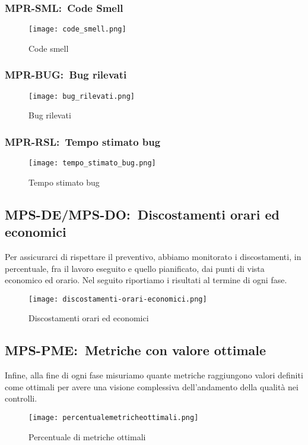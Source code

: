 \documentclass[../piano-di-qualifica.tex]{subfiles}
\begin{document}
\subsubsection{MPR-SML:~Code Smell}%
\label{subs:code_smell}


\begin{figure}[H]
  \centering
  \texttt{[image: code\_smell.png]}%
  \caption{Code smell}%
  \label{fig:code_smell}%
\end{figure}


\subsubsection{MPR-BUG:~Bug rilevati}%
\label{subs:bug_rilevati}

\begin{figure}[H]
  \centering
  \texttt{[image: bug\_rilevati.png]}%
  \caption{Bug rilevati}%
  \label{fig:bug_rilevati}%
\end{figure}

\subsubsection{MPR-RSL:~Tempo stimato bug}%
\label{subs:tempo_stimato}

\begin{figure}[H]
  \centering
  \texttt{[image: tempo\_stimato\_bug.png]}%
  \caption{Tempo stimato bug}%
  \label{fig:tempo_stimato_bug}%
\end{figure}


\newpage

\subsection{MPS-DE/MPS-DO:~Discostamenti orari ed economici}%
\label{sub:discostamenti_orari_ed_economici}
Per assicurarci di rispettare il preventivo, abbiamo monitorato i discostamenti, in percentuale, fra il lavoro eseguito e quello pianificato, dai punti di vista economico ed orario. Nel seguito riportiamo i risultati al termine di ogni fase.

\begin{figure}[H]
  \centering
  \texttt{[image: discostamenti-orari-economici.png]}%
  \caption{Discostamenti orari ed economici}%
  \label{fig:discostamenti_orari_economici}%
\end{figure}

\subsection{MPS-PME:~Metriche con valore ottimale}%
\label{sub:metriche_ottimali}
Infine, alla fine di ogni fase misuriamo quante metriche raggiungono valori definiti come ottimali per avere una visione complessiva dell'andamento della qualità nei controlli.
\begin{figure}[H]
  \centering
  \texttt{[image: percentualemetricheottimali.png]}%
  \caption{Percentuale di metriche ottimali}%
  \label{fig:metriche_ottimali}%
\end{figure}
\end{document}

